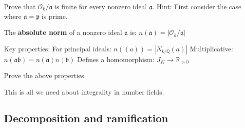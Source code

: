 \begin{outline}
\0 \begin{exercise}
Prove that $\mathcal{O}_k/\mathfrak{a}$ is finite for every nonzero ideal $\mathfrak{a}$.
Hint: First consider the case where $\mathfrak{a} = \mathfrak{p}$ is prime.
\end{exercise}

\0 \begin{definition}
The \textbf{absolute norm} of a nonzero ideal $\mathfrak{a}$ is:
$n(\mathfrak{a}) = |\mathcal{O}_k/\mathfrak{a}|$
\end{definition}
\1 Key properties:
    \2 For principal ideals: $n((a)) = |N_{k/\mathbb{Q}}(a)|$
    \2 Multiplicative: $n(\mathfrak{a}\mathfrak{b}) = n(\mathfrak{a})n(\mathfrak{b})$
    \2 Defines a homomorphism: $J_K \to \mathbb{R}_{>0}$
    
\0 \begin{exercise}
    Prove the above properties.
\end{exercise}

This is all we need about integrality in number fields.
\end{outline}

\subsection{Decomposition and ramification}

